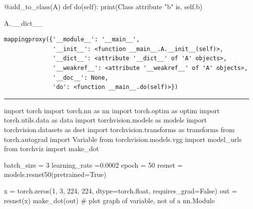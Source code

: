 \documentclass[
  a4paper,
]{book}
\newenvironment{Shaded}{\begin{snugshade}}{\end{snugshade}}
\newcommand{\AttributeTok}[1]{\textcolor[rgb]{0.40,0.45,0.13}{#1}}
\newcommand{\BuiltInTok}[1]{\textcolor[rgb]{0.00,0.23,0.31}{#1}}
\newcommand{\CommentTok}[1]{\textcolor[rgb]{0.37,0.37,0.37}{#1}}
\newcommand{\DecValTok}[1]{\textcolor[rgb]{0.68,0.00,0.00}{#1}}
\newcommand{\FloatTok}[1]{\textcolor[rgb]{0.68,0.00,0.00}{#1}}
\newcommand{\ImportTok}[1]{\textcolor[rgb]{0.00,0.46,0.62}{#1}}
\newcommand{\KeywordTok}[1]{\textcolor[rgb]{0.00,0.23,0.31}{#1}}
\newcommand{\NormalTok}[1]{\textcolor[rgb]{0.00,0.23,0.31}{#1}}
\newcommand{\OperatorTok}[1]{\textcolor[rgb]{0.37,0.37,0.37}{#1}}
\newcommand{\StringTok}[1]{\textcolor[rgb]{0.13,0.47,0.30}{#1}}
\newcommand{\VariableTok}[1]{\textcolor[rgb]{0.07,0.07,0.07}{#1}}
\numberwithin{equation}{section}
\theoremstyle{plain}
\theoremstyle{remark}
\begin{document}
\begin{Shaded}
\begin{Highlighting}[]
\AttributeTok{@add\_to\_class}\NormalTok{(A)}
\KeywordTok{def}\NormalTok{ do(}\VariableTok{self}\NormalTok{):}
    \BuiltInTok{print}\NormalTok{(}\StringTok{\textquotesingle{}Class attribute "b" is\textquotesingle{}}\NormalTok{, }\VariableTok{self}\NormalTok{.b)}
\end{Highlighting}
\end{Shaded}

\begin{Shaded}
\begin{Highlighting}[]
\NormalTok{A.\_\_dict\_\_}
\end{Highlighting}
\end{Shaded}

\begin{verbatim}
mappingproxy({'__module__': '__main__',
              '__init__': <function __main__.A.__init__(self)>,
              '__dict__': <attribute '__dict__' of 'A' objects>,
              '__weakref__': <attribute '__weakref__' of 'A' objects>,
              '__doc__': None,
              'do': <function __main__.do(self)>})
\end{verbatim}

\begin{center}\rule{0.5\linewidth}{0.5pt}\end{center}

\begin{Shaded}
\begin{Highlighting}[]
\ImportTok{import}\NormalTok{ torch}
\ImportTok{import}\NormalTok{ torch.nn }\ImportTok{as}\NormalTok{ nn}
\ImportTok{import}\NormalTok{ torch.optim }\ImportTok{as}\NormalTok{ optim}
\ImportTok{import}\NormalTok{ torch.utils.data }\ImportTok{as}\NormalTok{ data}
\ImportTok{import}\NormalTok{ torchvision.models }\ImportTok{as}\NormalTok{ models}
\ImportTok{import}\NormalTok{ torchvision.datasets }\ImportTok{as}\NormalTok{ dset}
\ImportTok{import}\NormalTok{ torchvision.transforms }\ImportTok{as}\NormalTok{ transforms}
\ImportTok{from}\NormalTok{ torch.autograd }\ImportTok{import}\NormalTok{ Variable}
\ImportTok{from}\NormalTok{ torchvision.models.vgg }\ImportTok{import}\NormalTok{ model\_urls}
\ImportTok{from}\NormalTok{ torchviz }\ImportTok{import}\NormalTok{ make\_dot}


\NormalTok{batch\_size }\OperatorTok{=} \DecValTok{3}
\NormalTok{learning\_rate }\OperatorTok{=}\FloatTok{0.0002}
\NormalTok{epoch }\OperatorTok{=} \DecValTok{50}
\NormalTok{resnet }\OperatorTok{=}\NormalTok{ models.resnet50(pretrained}\OperatorTok{=}\VariableTok{True}\NormalTok{)}

\NormalTok{x }\OperatorTok{=}\NormalTok{ torch.zeros(}\DecValTok{1}\NormalTok{, }\DecValTok{3}\NormalTok{, }\DecValTok{224}\NormalTok{, }\DecValTok{224}\NormalTok{, dtype}\OperatorTok{=}\NormalTok{torch.}\BuiltInTok{float}\NormalTok{, requires\_grad}\OperatorTok{=}\VariableTok{False}\NormalTok{)}
\NormalTok{out }\OperatorTok{=}\NormalTok{ resnet(x)}
\NormalTok{make\_dot(out)  }\CommentTok{\# plot graph of variable, not of a nn.Module}
\end{Highlighting}
\end{Shaded}
\end{document}

